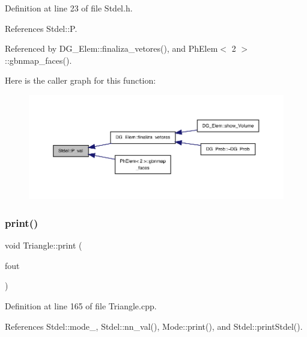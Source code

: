Definition at line 23 of file Stdel.\+h.



References Stdel\+::P.



Referenced by D\+G\+\_\+\+Elem\+::finaliza\+\_\+vetores(), and Ph\+Elem$<$ 2 $>$\+::gbnmap\+\_\+faces().

Here is the caller graph for this function\+:
\nopagebreak
\begin{figure}[H]
\begin{center}
\leavevmode
\includegraphics[width=350pt]{classStdel_a701c7d5595d4f6632333c4202898983b_icgraph}
\end{center}
\end{figure}
\mbox{\label{classTriangle_ad9159142cf526db5cf44035c62a1f927}} 
\subsubsection{\texorpdfstring{print()}{print()}}
{\footnotesize\ttfamily void Triangle\+::print (\begin{DoxyParamCaption}\item[{F\+I\+LE $\ast$}]{fout }\end{DoxyParamCaption})}



Definition at line 165 of file Triangle.\+cpp.



References Stdel\+::mode\+\_\+, Stdel\+::nn\+\_\+val(), Mode\+::print(), and Stdel\+::print\+Stdel().

